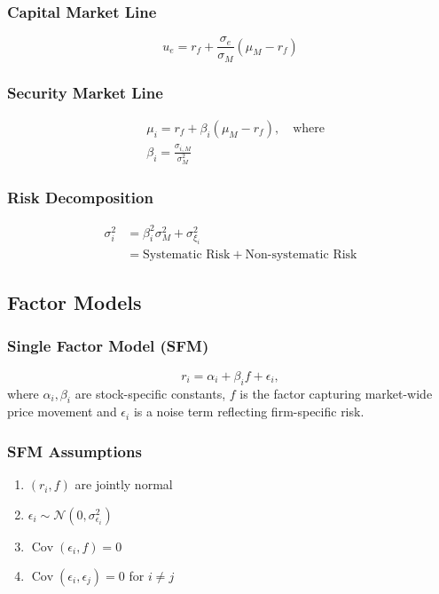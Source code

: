 \documentclass[11pt]{article}
\newcommand{\Cov}{\operatorname{Cov}}
\begin{document}
	\subsubsection{Capital Market Line}
	\[	u_{e} = r_{f} + \frac{\sigma_{e}}{\sigma_{M}}(\mu_{M} - r_{f})\]
	\subsubsection{Security Market Line}
	
	\begin{align*}
	&\mu_i = r_f + \beta_i (\mu_M - r_f), \quad\text{where} \\[4pt]
	&\beta_i = \frac{\sigma_{i, M}}{\sigma_{M}^2}
	\end{align*}	
	\subsubsection{Risk Decomposition}
	\begin{align*}
		\sigma_i^2 & = \beta_i^2 \sigma_M^2 + \sigma_{\xi_{i}}^2 \\
		& = \text{Systematic Risk} + \text{Non-systematic Risk}
	\end{align*}	
	\subsection{Factor Models}
	\subsubsection{Single Factor Model (SFM)}
	\[	r_i = \alpha_i + \beta_i f + \epsilon_i, \]
	where \( \alpha_i, \beta_i \) are stock-specific constants, \( f \) is the factor capturing market-wide price movement and \( \epsilon_i \) is a noise term reflecting firm-specific risk.
	\subsubsection{SFM Assumptions}
	\begin{enumerate}
		\item \( (r_i, f) \) are jointly normal
		\item \( \epsilon_i\sim\mathcal{N}(0, \sigma_{\epsilon_i}^2) \)
		\item \( \Cov(\epsilon_i, f) = 0 \)
		\item \( \Cov(\epsilon_i, \epsilon_j) = 0 \) for \( i\neq j \)
	\end{enumerate}
\end{document}
